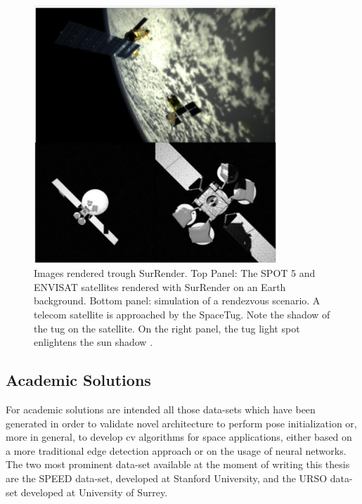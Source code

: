 \begin{figure}[htbp]
  \centering
  \includegraphics[width=0.82\textwidth]{gfx/surrender.eps}
  \caption{Images rendered trough SurRender. Top Panel: The SPOT 5 and ENVISAT satellites rendered with SurRender on an Earth background. Bottom
    panel: simulation of a rendezvous scenario. A telecom satellite is approached by the SpaceTug. Note the shadow of
    the tug on the satellite. On the right panel, the tug light spot enlightens the sun shadow \cite{Brochard2018ScientificIR}.}
  \label{fig:surrender}
\end{figure}

\subsection{Academic Solutions}
For academic solutions are intended all those data-sets which have been generated in order to validate novel architecture to perform pose initialization or, more in general, to develop \acrshort{cv} algorithms for space applications, either based on a more traditional edge detection approach or on the usage of neural networks. The two most prominent data-set available at the moment of writing this thesis are the SPEED data-set, developed at Stanford University, and the URSO data-set developed at University of Surrey.

